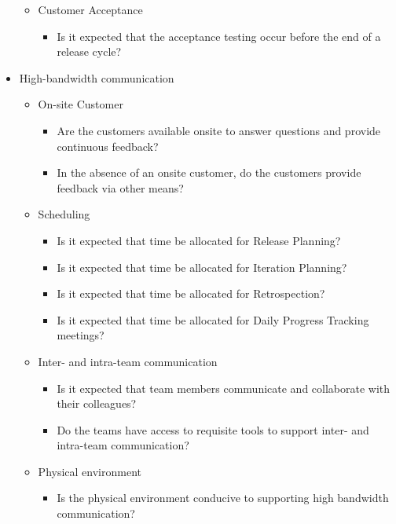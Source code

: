 \begin{appendices}
\begin{itemize}
\begin{itemize}
\begin{itemize}
				\end{itemize}			
		\end{itemize}
		\begin{itemize}
			\item Customer Acceptance
				\begin{itemize}
					\item Is it expected that the acceptance testing occur before the end of a release cycle?
				\end{itemize}
		\end{itemize}
	\item High-bandwidth communication
		\begin{itemize}
			\item On-site Customer
				\begin{itemize}
					\item Are the customers available onsite to answer questions and provide continuous feedback? 
					\item In the absence of an onsite customer, do the customers provide feedback via other means? 
				\end{itemize}	
			\item Scheduling
				\begin{itemize}
					\item Is it expected that time be allocated for Release Planning?
					\item Is it expected that time be allocated for Iteration Planning?
					\item Is it expected that time be allocated for Retrospection? 
					\item Is it expected that time be allocated for Daily Progress Tracking meetings?
				\end{itemize}
			\item Inter- and intra-team communication
				\begin{itemize}
					\item Is it expected that team members communicate and collaborate with their colleagues?
					\item Do the teams have access to requisite tools to support inter- and intra-team communication?
				\end{itemize}
			\item Physical environment
				\begin{itemize}
					\item Is the physical environment conducive to supporting high bandwidth communication?

\end{itemize}
\end{itemize}
\end{itemize}
\end{appendices}

